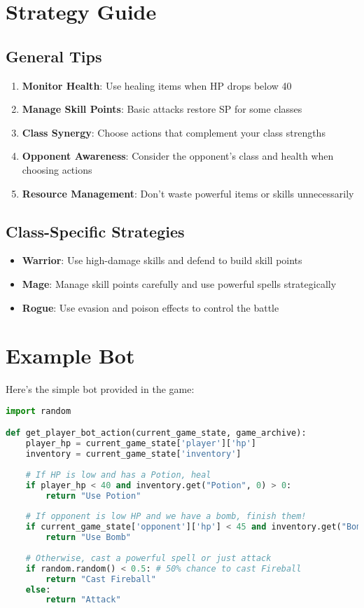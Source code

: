 \documentclass[12pt]{article}
\begin{document}
\section{Strategy Guide}
\label{sec:strategy}

\subsection{General Tips}
\begin{enumerate}
    \item \textbf{Monitor Health}: Use healing items when HP drops below 40
    \item \textbf{Manage Skill Points}: Basic attacks restore SP for some classes
    \item \textbf{Class Synergy}: Choose actions that complement your class strengths
    \item \textbf{Opponent Awareness}: Consider the opponent's class and health when choosing actions
    \item \textbf{Resource Management}: Don't waste powerful items or skills unnecessarily
\end{enumerate}

\subsection{Class-Specific Strategies}
\begin{itemize}
    \item \textbf{Warrior}: Use high-damage skills and defend to build skill points
    \item \textbf{Mage}: Manage skill points carefully and use powerful spells strategically
    \item \textbf{Rogue}: Use evasion and poison effects to control the battle
\end{itemize}

\section{Example Bot}
\label{sec:example}

Here's the simple bot provided in the game:

\begin{lstlisting}[language=Python, caption=Example Bot Implementation]
import random

def get_player_bot_action(current_game_state, game_archive):
    player_hp = current_game_state['player']['hp']
    inventory = current_game_state['inventory']
    
    # If HP is low and has a Potion, heal
    if player_hp < 40 and inventory.get("Potion", 0) > 0:
        return "Use Potion"
    
    # If opponent is low HP and we have a bomb, finish them!
    if current_game_state['opponent']['hp'] < 45 and inventory.get("Bomb", 0) > 0:
        return "Use Bomb"
        
    # Otherwise, cast a powerful spell or just attack
    if random.random() < 0.5: # 50% chance to cast Fireball
        return "Cast Fireball"
    else:
        return "Attack"
\end{lstlisting}
\end{document}
